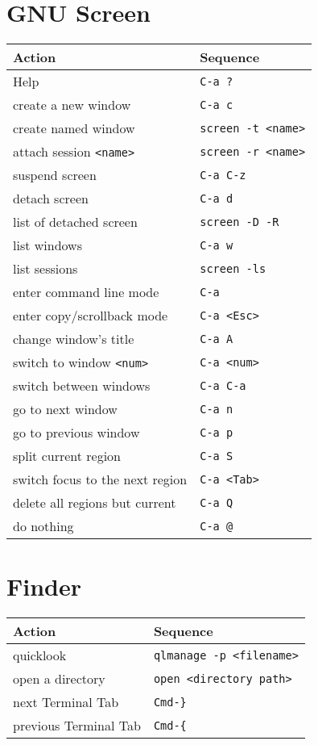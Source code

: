 \documentclass[report,twocolumn]{IEEEtran}
\begin{document}
\section{GNU Screen}
\begin{center}
\begin{tabular}{ l | l }
\hline
Action & Sequence\\
\hline
Help & \texttt{C-a ?}\\
\hline
create a new window & \texttt{C-a c}\\
create named window & \texttt{screen -t <name>}\\
attach session \texttt{<name>} & \texttt{screen -r <name>}\\
suspend screen & \texttt{C-a C-z}\\
detach screen & \texttt{C-a d}\\
list of detached screen & \texttt{screen -D -R} \\
list windows & \texttt{C-a w}\\
list sessions & \texttt{screen -ls}\\
\hline
enter command line mode & \texttt{C-a}\\ 
enter copy/scrollback mode & \texttt{C-a <Esc>}\\
change window's title & \texttt{C-a A}\\
switch to window \texttt{<num>} & \texttt{C-a \texttt{<num>}}\\
switch between windows & \texttt{C-a C-a}\\
go to next window & \texttt{C-a n}\\
go to previous window & \texttt{C-a p}\\
split current region & \texttt{C-a S}\\
switch focus to the next region & \texttt{C-a <Tab>}\\
delete all regions but current & \texttt{C-a Q}\\
do nothing & \texttt{C-a @}\\
\hline
\end{tabular}
\end{center}

\section{Finder}
\begin{center}
\begin{tabular}{ l | l }
\hline
Action & Sequence\\
\hline
quicklook & \texttt{qlmanage -p <filename>} \\
open a directory & \texttt{open <directory path>} \\
next Terminal Tab & \texttt{Cmd-\}} \\
previous  Terminal Tab & \texttt{Cmd-\{} \\
\hline
\end{tabular}
\end{center}
\end{document}
